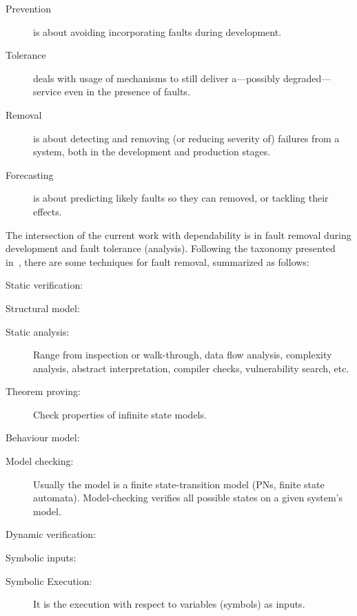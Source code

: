 \documentclass[12pt,openright,twoside,a4paper,oldfontcommands,english,brazil,final]{abntex2}
\theoremstyle{theo}
\begin{document}
\begin{description}
  \item[Prevention] is about avoiding incorporating faults during development.
  \item[Tolerance] deals with usage of mechanisms to still deliver a---possibly degraded---service even in the presence of faults.
  \item[Removal] is about detecting and removing (or reducing severity of) failures from a system, both in the development and production stages.
  \item[Forecasting] is about predicting likely faults so they can removed, or tackling their effects.
\end{description}

\begin{sloppypar}
The intersection of the current work with dependability is in fault removal during development and fault tolerance (analysis).
Following the taxonomy presented in~\cite{ALR+2004}, there are some techniques for fault removal, summarized as follows:
\begin{alineas}
  \item Static verification:
  \begin{subalineas}
    \item Structural model:
    \begin{description}
      \item[Static analysis:] Range from inspection or walk-through, data flow analysis, complexity analysis, abstract interpretation, compiler checks, vulnerability search, etc.
      \item[Theorem proving:] Check properties of infinite state models.
    \end{description}
    \item Behaviour model:
    \begin{description}
      \item[Model checking:] Usually the model is a finite state-transition model (\acp{PN}, finite state automata).
      Model-checking verifies all possible states on a given system's model.
    \end{description}
  \end{subalineas}
  \item Dynamic verification:
  \begin{subalineas}
    \item Symbolic inputs:
    \begin{description}
      \item[Symbolic Execution:] It is the execution with respect to variables (symbols) as inputs.

\end{description}
\end{subalineas}
\end{alineas}
\end{sloppypar}
\end{document}
